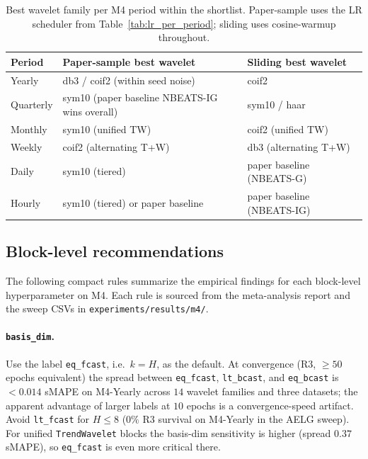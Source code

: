 \documentclass[11pt,a4paper]{article}
\begin{document}
\begin{table}[h]
\centering
\small
\caption{Best wavelet family per M4 period within the shortlist. Paper-sample uses the LR scheduler from Table~\ref{tab:lr_per_period}; sliding uses cosine-warmup throughout.}
\label{tab:wavelet_per_period}
\begin{tabular}{@{}lll@{}}
\toprule
Period & Paper-sample best wavelet & Sliding best wavelet \\
\midrule
Yearly    & db3 / coif2 (within seed noise)         & coif2 \\
Quarterly & sym10 (paper baseline NBEATS-IG wins overall) & sym10 / haar \\
Monthly   & sym10 (unified TW)                      & coif2 (unified TW) \\
Weekly    & coif2 (alternating T+W)                 & db3 (alternating T+W) \\
Daily     & sym10 (tiered)                          & paper baseline (NBEATS-G) \\
Hourly    & sym10 (tiered) or paper baseline        & paper baseline (NBEATS-IG) \\
\bottomrule
\end{tabular}
\end{table}

\subsection{Block-level recommendations}
\label{app:hyperparams:block}

The following compact rules summarize the empirical findings for each block-level hyperparameter on M4. Each rule is sourced from the meta-analysis report and the sweep CSVs in \texttt{experiments/results/m4/}.

\paragraph{\texttt{basis\_dim}.} Use the label \texttt{eq\_fcast}, i.e.\ $k = H$, as the default. At convergence (R3, $\geq 50$ epochs equivalent) the spread between \texttt{eq\_fcast}, \texttt{lt\_bcast}, and \texttt{eq\_bcast} is $<0.014$ sMAPE on M4-Yearly across $14$ wavelet families and three datasets; the apparent advantage of larger labels at $10$ epochs is a convergence-speed artifact. Avoid \texttt{lt\_fcast} for $H \le 8$ ($0\%$ R3 survival on M4-Yearly in the AELG sweep). For unified \texttt{TrendWavelet} blocks the basis-dim sensitivity is higher (spread $0.37$ sMAPE), so \texttt{eq\_fcast} is even more critical there.
\end{document}
